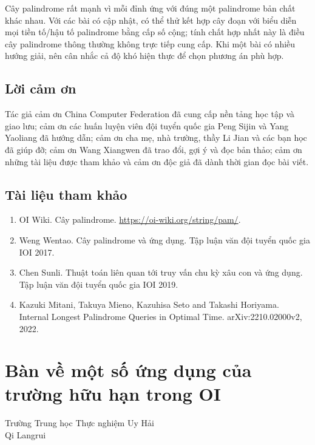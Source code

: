 \documentclass[11pt]{article}
\begin{document}
Cây palindrome rất mạnh vì mỗi đỉnh ứng với đúng một palindrome bản chất khác
nhau. Với các bài có cập nhật, có thể thử kết hợp cây đoạn với biểu diễn mọi
tiền tố/hậu tố palindrome bằng cấp số cộng; tính chất hợp nhất này là điều cây
palindrome thông thường không trực tiếp cung cấp. Khi một bài có nhiều hướng
giải, nên cân nhắc cả độ khó hiện thực để chọn phương án phù hợp.

\subsection{Lời cảm ơn}

Tác giả cảm ơn China Computer Federation đã cung cấp nền tảng học tập và giao
lưu; cảm ơn các huấn luyện viên đội tuyển quốc gia Peng Sijin và Yang Yaoliang
đã hướng dẫn; cảm ơn cha mẹ, nhà trường, thầy Li Jian và các bạn học đã giúp
đỡ; cảm ơn Wang Xiangwen đã trao đổi, gợi ý và đọc bản thảo; cảm ơn những tài
liệu được tham khảo và cảm ơn độc giả đã dành thời gian đọc bài viết.

\subsection{Tài liệu tham khảo}

\begin{enumerate}
  \item OI Wiki. Cây palindrome. \url{https://oi-wiki.org/string/pam/}.
  \item Weng Wentao. Cây palindrome và ứng dụng. Tập luận văn đội tuyển quốc gia
  IOI 2017.
  \item Chen Sunli. Thuật toán liên quan tới truy vấn chu kỳ xâu con và ứng dụng.
  Tập luận văn đội tuyển quốc gia IOI 2019.
  \item Kazuki Mitani, Takuya Mieno, Kazuhisa Seto and Takashi Horiyama.
  Internal Longest Palindrome Queries in Optimal Time. arXiv:2210.02000v2,
  2022.
\end{enumerate}

\section{Bàn về một số ứng dụng của trường hữu hạn trong OI}

\begin{center}
Trường Trung học Thực nghiệm Uy Hải\\
Qi Langrui
\end{center}

\renewcommand{\abstractname}{Tóm tắt}
\begin{abstract}
Bài viết giới thiệu các khái niệm cơ bản về trường hữu hạn, rồi trình bày một
số ứng dụng của trường hữu hạn có đặc trưng bằng \(2\) trong OI, gồm bài toán
đường đi đơn dài nhất và bài toán \emph{Graph Motif}.
\end{abstract}
\end{document}
